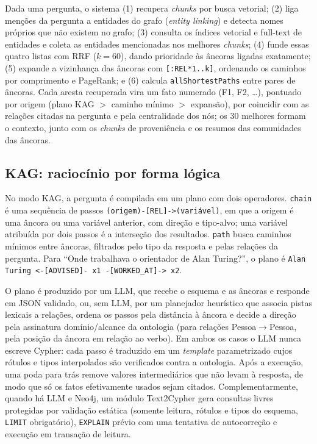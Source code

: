 \documentclass[12pt]{article}
\begin{document}
Dada uma pergunta, o sistema (1) recupera \textit{chunks} por busca vetorial; (2) liga menções da pergunta a entidades do grafo (\textit{entity linking}) e detecta nomes próprios que não existem no grafo; (3) consulta os índices vetorial e full-text de entidades e coleta as entidades mencionadas nos melhores \textit{chunks}; (4) funde essas quatro listas com RRF ($k=60$), dando prioridade às âncoras ligadas exatamente; (5) expande a vizinhança das âncoras com \texttt{[:REL*1..k]}, ordenando os caminhos por comprimento e PageRank; e (6) calcula \texttt{allShortestPaths} entre pares de âncoras. Cada aresta recuperada vira um fato numerado (F1, F2, \ldots), pontuado por origem (plano KAG $>$ caminho mínimo $>$ expansão), por coincidir com as relações citadas na pergunta e pela centralidade dos nós; os 30 melhores formam o contexto, junto com os \textit{chunks} de proveniência e os resumos das comunidades das âncoras.

\subsection{KAG: raciocínio por forma lógica}

No modo KAG, a pergunta é compilada em um plano com dois operadores. \texttt{chain} é uma sequência de passos \texttt{(origem)-[REL]->(variável)}, em que a origem é uma âncora ou uma variável anterior, com direção e tipo-alvo; uma variável atribuída por dois passos é a interseção dos resultados. \texttt{path} busca caminhos mínimos entre âncoras, filtrados pelo tipo da resposta e pelas relações da pergunta. Para ``Onde trabalhava o orientador de Alan Turing?'', o plano é \texttt{Alan Turing <-[ADVISED]- x1 -[WORKED\_AT]-> x2}.

O plano é produzido por um LLM, que recebe o esquema e as âncoras e responde em JSON validado, ou, sem LLM, por um planejador heurístico que associa pistas lexicais a relações, ordena os passos pela distância à âncora e decide a direção pela assinatura domínio/alcance da ontologia (para relações Pessoa$\rightarrow$Pessoa, pela posição da âncora em relação ao verbo). Em ambos os casos o LLM nunca escreve Cypher: cada passo é traduzido em um \textit{template} parametrizado cujos rótulos e tipos interpolados são verificados contra a ontologia. Após a execução, uma poda para trás remove valores intermediários que não levam à resposta, de modo que só os fatos efetivamente usados sejam citados. Complementarmente, quando há LLM e Neo4j, um módulo Text2Cypher gera consultas livres protegidas por validação estática (somente leitura, rótulos e tipos do esquema, \texttt{LIMIT} obrigatório), \texttt{EXPLAIN} prévio com uma tentativa de autocorreção e execução em transação de leitura.
\end{document}
